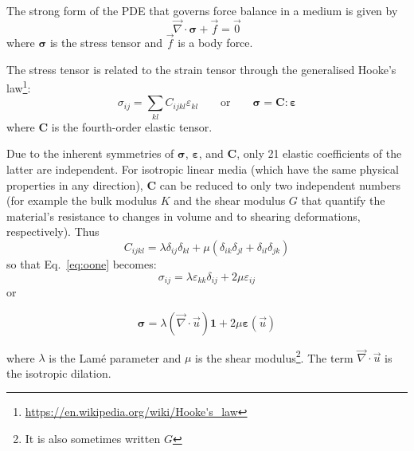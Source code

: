 The strong form of the PDE that governs force balance in a medium is given by
\[
\vec{\nabla}\cdot{\bm \sigma}  + \vec{f} = \vec{0}
\]
where ${\bm \sigma}$ is the stress tensor and $\vec{f}$ is a body force.

The stress tensor is related to the strain tensor through the generalised 
Hooke's law\footnote{\url{https://en.wikipedia.org/wiki/Hooke's_law}}:
\begin{equation}
\sigma_{ij}=\sum_{kl}C_{ijkl}\varepsilon_{kl} 
\qquad
\text{or}
\qquad
{\bm \sigma} = {\bm C} : {\bm \varepsilon}
\label{eq:oone}
\end{equation}
where ${\bm C}$ is the fourth-order elastic tensor.

Due to the inherent symmetries of ${\bm \sigma}$, ${\bm \varepsilon}$, and ${\bm C}$, 
only 21 elastic coefficients of the latter are independent. 
For isotropic linear media (which have the same physical properties in any direction), ${\bm C}$ 
can be reduced to only two independent numbers (for example the bulk modulus $K$ and the shear modulus $G$ 
that quantify the material's resistance to changes in volume and to shearing deformations, respectively).
Thus
\[
C_{ijkl} = \lambda \delta_{ij}\delta_{kl} + \mu (\delta_{ik}\delta_{jl}+\delta_{il}\delta_{jk})
\]
so that Eq.~\eqref{eq:oone} becomes:
\[
\sigma_{ij}=\lambda \varepsilon_{kk} \delta_{ij} + 2\mu \varepsilon_{ij}
\]
or
\begin{mdframed}[backgroundcolor=blue!5]
\begin{equation}
{\bm \sigma}=\lambda (\vec{\nabla}\cdot\vec{u}) {\bm 1} +2\mu {\bm \varepsilon}(\vec{u}) \label{eq:twoELAST}
\end{equation}
\end{mdframed}
where $\lambda$ is the Lam\'e parameter and $\mu$ is the shear 
modulus\footnote{It is also sometimes written $G$}.
The term $\vec{\nabla}\cdot\vec{u}$ is the isotropic dilation.


